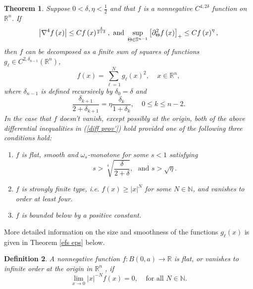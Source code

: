 \documentclass{amsart}
\newtheorem{theorem}{Theorem}[section]
\theoremstyle{plain}
\newtheorem{definition}[theorem]{Definition}
\numberwithin{equation}{section}
\begin{document}
\begin{theorem}
\label{diff prov thm} Suppose $0<\delta ,\eta <\frac{1}{2}$ and that $f$ is
a nonnegative $C^{4,2\delta }$ function on $\mathbb{R}^{n}$. If%
\begin{equation}
\left\vert \nabla ^{4}f\left( x\right) \right\vert \leq Cf\left( x\right) ^{%
\frac{\delta }{2+\delta }},\text{ and }\sup_{\Theta \in \mathbb{S}^{n-1}}%
\left[ \partial _{\Theta }^{2}f\left( x\right) \right] _{+}\leq Cf\left(
x\right) ^{\eta },  \label{diff prov'}
\end{equation}%
then $f$ can be decomposed as a finite sum of squares of functions $g_{\ell
}\in C^{2,\delta _{n-1}}\left( \mathbb{R}^{n}\right) $, 
\begin{equation*}
f\left( x\right) =\sum_{\ell =1}^{N}g_{\ell }\left( x\right) ^{2},\ \ \ \ \
x\in \mathbb{R}^{n},
\end{equation*}%
where $\delta _{n-1}$ is defined recursively by $\delta _{0}=\delta $ and%
\begin{equation*}
\frac{\delta _{k+1}}{2+\delta _{k+1}}=\eta \frac{\delta _{k}}{1+\delta _{k}}%
,\ \ \ \ \ 0\leq k\leq n-2.
\end{equation*}%
In the case that $f$ doesn't vanish, except possibly at the origin, both of
the above differential inequalities in (\ref{diff prov'}) hold provided one
of the following three conditions hold:

\begin{enumerate}
\item $f$ is flat, smooth and $\omega _{s}$-monotone for some $s<1$
satisfying%
\begin{equation*}
s>\sqrt[4]{\frac{\delta }{2+\delta }},\ \ \ \text{and \ \ \ }s>\sqrt{\eta }.
\end{equation*}

\item $f$ is strongly finite type, i.e. $f\left( x\right) \geq \left\vert
x\right\vert ^{N}$ for some $N\in \mathbb{N}$, and vanishes to order at
least four.

\item $f$ is bounded below by a positive constant.
\end{enumerate}
\end{theorem}

More detailed information on the size and smoothness of the functions $%
g_{\ell }\left( x\right) $ is given in Theorem \ref{efs eps} below.

\begin{definition}
A nonnegative function $f:B\left( 0,a\right) \rightarrow \mathbb{R}$ is 
\emph{flat}, or vanishes to infinite order at the origin in $\mathbb{R}^{n}$%
, if 
\begin{equation*}
\lim_{x\rightarrow 0}\left\vert x\right\vert ^{-N}f\left( x\right) =0,\ \ \
\ \ \text{for all }N\in \mathbb{N}.
\end{equation*}
\end{definition}
\end{document}
